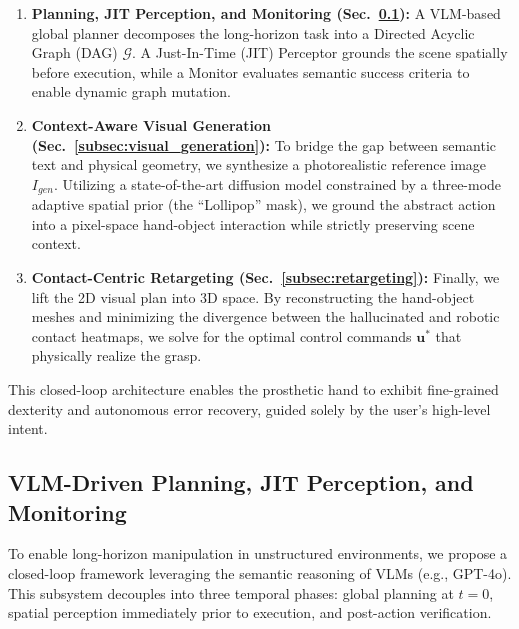 \documentclass[letterpaper, 10 pt, conference]{ieeeconf}  %
\begin{document}
\begin{enumerate}
    \item \textbf{Planning, JIT Perception, and Monitoring (Sec.~\ref{subsec:planning_monitoring}):} 
    A VLM-based global planner decomposes the long-horizon task into a Directed Acyclic Graph (DAG) $\mathcal{G}$. A Just-In-Time (JIT) Perceptor grounds the scene spatially before execution, while a Monitor evaluates semantic success criteria to enable dynamic graph mutation.
    
    \item \textbf{Context-Aware Visual Generation (Sec.~\ref{subsec:visual_generation}):} 
    To bridge the gap between semantic text and physical geometry, we synthesize a photorealistic reference image $I_{gen}$. Utilizing a state-of-the-art diffusion model constrained by a three-mode adaptive spatial prior (the ``Lollipop'' mask), we ground the abstract action into a pixel-space hand-object interaction while strictly preserving scene context.
    
    \item \textbf{Contact-Centric Retargeting (Sec.~\ref{subsec:retargeting}):} 
    Finally, we lift the 2D visual plan into 3D space. By reconstructing the hand-object meshes and minimizing the divergence between the hallucinated and robotic contact heatmaps, we solve for the optimal control commands $\mathbf{u}^*$ that physically realize the grasp.
\end{enumerate}

This closed-loop architecture enables the prosthetic hand to exhibit fine-grained dexterity and autonomous error recovery, guided solely by the user's high-level intent.

\subsection{VLM-Driven Planning, JIT Perception, and Monitoring}
\label{subsec:planning_monitoring}

To enable long-horizon manipulation in unstructured environments, we propose a closed-loop framework leveraging the semantic reasoning of VLMs (e.g., GPT-4o). This subsystem decouples into three temporal phases: global planning at $t=0$, spatial perception immediately prior to execution, and post-action verification.
\end{document}
